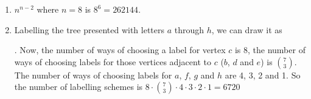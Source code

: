 \documentclass[10pt]{article}
\begin{document}
\begin{enumerate}
\begin{enumerate}
                        .

                    I also implemented an algorithm to draw trees from
                    Pr{\"u}fer sequences using a computer
                    https://bmcorser.github.io/2017/02/04/prufer.html\#fun
                \item $n^{n-2}$ where $n = 8$ is $8^6 = 262144$.
                \item Labelling the tree presented with letters $a$ through
                    $h$, we can draw it as
                    . Now, the number of ways of choosing a
                    label for vertex $c$ is 8, the number of ways of choosing
                    labels for those vertices adjacent to $c$ ($b$, $d$ and
                    $e$) is $\binom{7}{3}$. The number of ways of choosing
                    labels for $a$, $f$, $g$ and $h$ are 4, 3, 2 and 1. So the
                    number of labelling schemes is $8 \cdot \binom{7}{3} \cdot
                    4 \cdot 3 \cdot 2 \cdot 1 = 6720$
            \end{enumerate}
    \end{enumerate}
\end{document}
